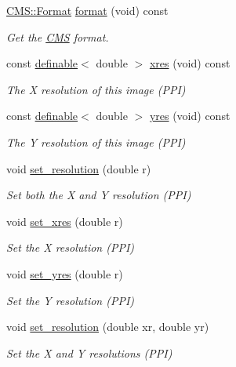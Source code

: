 \begin{DoxyCompactItemize}
\hyperlink{class_c_m_s_1_1_format}{C\+M\+S\+::\+Format} \hyperlink{class_photo_finish_1_1_image_af3e7c8a8d2da4244df61aee4179f3285}{format} (void) const
\begin{DoxyCompactList}\small\item\em Get the \hyperlink{namespace_c_m_s}{C\+MS} format. \end{DoxyCompactList}\item 
const \hyperlink{class_photo_finish_1_1definable}{definable}$<$ double $>$ \hyperlink{class_photo_finish_1_1_image_afaca8c09e654936291f078e28c7785ac}{xres} (void) const
\begin{DoxyCompactList}\small\item\em The X resolution of this image (P\+PI) \end{DoxyCompactList}\item 
const \hyperlink{class_photo_finish_1_1definable}{definable}$<$ double $>$ \hyperlink{class_photo_finish_1_1_image_a6f52945c791b47e598aa94a9c9643d66}{yres} (void) const
\begin{DoxyCompactList}\small\item\em The Y resolution of this image (P\+PI) \end{DoxyCompactList}\item 
void \hyperlink{class_photo_finish_1_1_image_ac2374ca246ba6c8b3d174fe4e7f74a25}{set\+\_\+resolution} (double r)
\begin{DoxyCompactList}\small\item\em Set both the X and Y resolution (P\+PI) \end{DoxyCompactList}\item 
void \hyperlink{class_photo_finish_1_1_image_a8e5edb65c6f92fee4ce7742e4ad61619}{set\+\_\+xres} (double r)
\begin{DoxyCompactList}\small\item\em Set the X resolution (P\+PI) \end{DoxyCompactList}\item 
void \hyperlink{class_photo_finish_1_1_image_a04eee7a8ff4ba52245cfcc32a7e54d31}{set\+\_\+yres} (double r)
\begin{DoxyCompactList}\small\item\em Set the Y resolution (P\+PI) \end{DoxyCompactList}\item 
void \hyperlink{class_photo_finish_1_1_image_ab0c3fd004f6fd3b39ea2e65d680911d1}{set\+\_\+resolution} (double xr, double yr)
\begin{DoxyCompactList}\small\item\em Set the X and Y resolutions (P\+PI) \end{DoxyCompactList}\item 

\end{DoxyCompactItemize}
